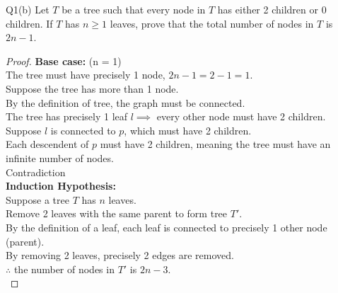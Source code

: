 \begin{problem}
  {Q1(b)}
  Let $T$ be a tree such that every node in $T$ has either 2 children or 0 children. If $T$ has $n \geq 1$ leaves, prove
  that the total number of nodes in $T$ is $2n-1$. \\
  \begin{proof}
    \textbf{Base case: } (n = 1) \\
    The tree must have precisely 1 node, $2n - 1 = 2 - 1 = 1$. \\
    Suppose the tree has more than 1 node. \\
    By the definition of tree, the graph must be connected. \\
    The tree has precisely 1 leaf $l \implies $ every other node must have 2 children. \\
    Suppose $l$ is connected to $p$, which must have 2 children. \\
    Each descendent of $p$ must have 2 children, meaning the tree must have an infinite number of nodes. \\
    Contradiction \\
    \textbf{Induction Hypothesis: } \\
    Suppose a tree $T$ has $n$ leaves. \\
    Remove 2 leaves with the same parent to form tree $T'$. \\
    By the definition of a leaf, each leaf is connected to precisely 1 other node (parent). \\
    By removing 2 leaves, precisely 2 edges are removed. \\
    $\therefore$ the number of nodes in $T'$ is $2n - 3$. \\
  \end{proof}
\end{problem}
